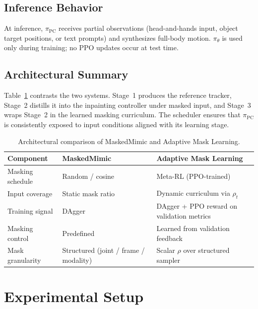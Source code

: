 \documentclass[10pt,letterpaper]{article}
\newcommand{\ppc}{\pi_{\mathrm{PC}}}
\newcommand{\pth}{\pi_{\theta}}
\begin{document}
\subsection{Inference Behavior}

At inference, $\ppc$ receives partial observations (head-and-hands input, object target positions, or text prompts) and synthesizes full-body motion. $\pth$ is used only during training; no PPO updates occur at test time.

\subsection{Architectural Summary}

Table~\ref{tab:arch} contrasts the two systems. Stage~1 produces the reference tracker, Stage~2 distills it into the inpainting controller under masked input, and Stage~3 wraps Stage~2 in the learned masking curriculum. The scheduler ensures that $\ppc$ is consistently exposed to input conditions aligned with its learning stage.

\begin{table}[h]
  \centering
  \small
  \caption{Architectural comparison of MaskedMimic and Adaptive Mask Learning.}
  \label{tab:arch}
  \begin{tabular}{lll}
    \toprule
    Component & MaskedMimic & Adaptive Mask Learning \\
    \midrule
    Masking schedule & Random / cosine & Meta-RL (PPO-trained) \\
    Input coverage & Static mask ratio & Dynamic curriculum via $\rho_t$ \\
    Training signal & DAgger & DAgger + PPO reward on validation metrics \\
    Masking control & Predefined & Learned from validation feedback \\
    Mask granularity & Structured (joint / frame / modality) & Scalar $\rho$ over structured sampler \\
    \bottomrule
  \end{tabular}
\end{table}

\section{Experimental Setup}
\end{document}
